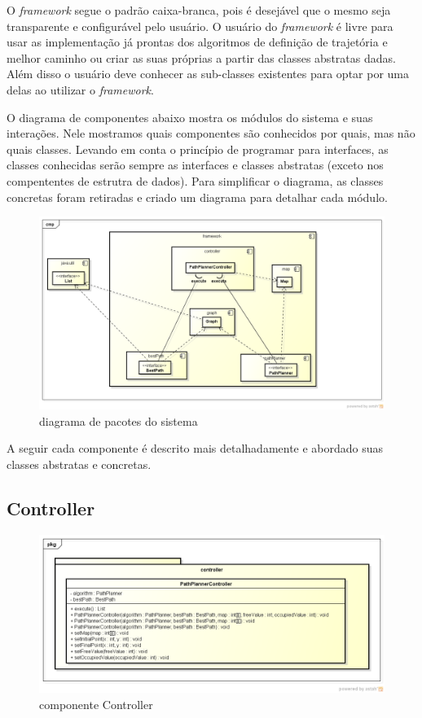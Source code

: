 O \textit{framework} segue o padrão caixa-branca, pois é desejável que o mesmo seja transparente e configurável pelo usuário. O usuário do \textit{framework} é livre para usar as implementação já prontas dos algoritmos de definição de trajetória e melhor caminho ou criar as suas próprias a partir das classes abstratas dadas. Além disso o usuário deve conhecer as sub-classes existentes para optar por uma delas ao utilizar o \textit{framework}.

O diagrama de componentes abaixo mostra os módulos do sistema e suas interações. Nele mostramos quais componentes são conhecidos por quais, mas não quais classes. Levando em conta o princípio de programar para interfaces, as classes conhecidas serão sempre as interfaces e classes abstratas (exceto nos compententes de estrutra de dados). Para simplificar o diagrama, as classes concretas foram retiradas e criado um diagrama para detalhar cada módulo.

\begin{figure}[h]
	\centering
	\label{fig20}
		\includegraphics[keepaspectratio=true,scale=0.4]{figuras/componentes.png}
	\caption{diagrama de pacotes do sistema}
\end{figure}

A seguir cada componente é descrito mais detalhadamente e abordado suas classes abstratas e concretas.

\subsection{Controller}

\begin{figure}[h]
	\centering
	\label{fig21}
		\includegraphics[keepaspectratio=true,scale=0.5]{figuras/pkgcontroller.png}
	\caption{componente Controller}
\end{figure}

